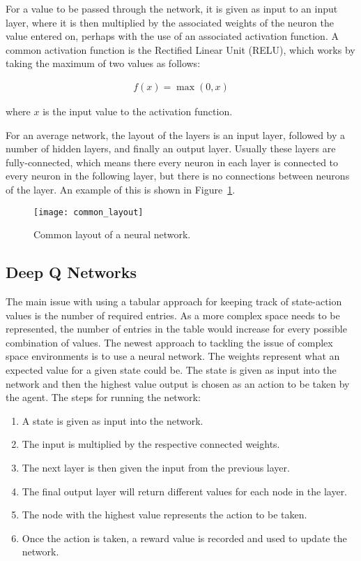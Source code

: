 For a value to be passed through the network, it is given as input to an input
layer, where it is then multiplied by the associated weights of the neuron the
value entered on, perhaps with the use of an associated activation function.  A
common activation function is the Rectified Linear Unit
(RELU)\cite{Nair:2010:RLU:3104322.3104425}, which works by taking the maximum
of two values as follows:

\begin{align}
    f(x) = \max(0, x)
\end{align}

where $x$ is the input value to the activation function.

For an average network, the layout of the layers is an input layer,
followed by a number of hidden layers, and finally an output layer. Usually
these layers are fully-connected, which means there every neuron in each
layer is connected to  every neuron in the following layer, but
there is no connections between neurons of the layer. An example of this
is shown in Figure~\ref{fig:common_layout}.

\begin{figure}
    \centering
    \texttt{[image: common\_layout]}
    \caption{Common layout of a neural network.}%
    \label{fig:common_layout}
\end{figure}


\subsection{Deep Q Networks}

The main issue with using a tabular approach for keeping track of state-action
values is the number of required entries. As a more complex space needs to be
represented, the number of entries in the table would increase for every
possible combination of values. The newest approach to tackling the issue of
complex space environments is to use a neural network. The weights represent
what an expected value for a given state could be. The state is given as input
into the network and then the highest value output is chosen as an action to be
taken by the agent. The steps for running the network:

\begin{enumerate}
    \item A state is given as input into the network.
    \item The input is multiplied by the respective connected weights.
    \item The next layer is then given the input from the previous layer.
    \item The final output layer will return different values for each node in the layer.
    \item The node with the highest value represents the action to be taken.
    \item Once the action is taken, a reward value is recorded and used to update the network.
\end{enumerate}

